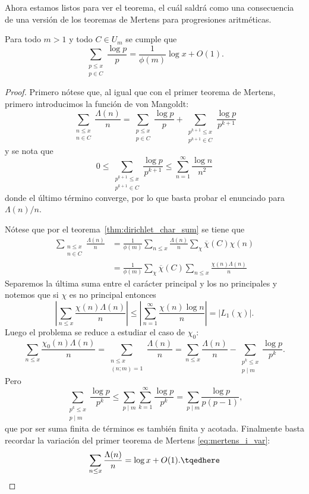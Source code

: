 \documentclass[teoria-numeros.tex]{subfiles}
\begin{document}
Ahora estamos listos para ver el teorema, el cuál saldrá como una consecuencia de una versión de los teoremas de Mertens para progresiones aritméticas.
\begin{thm}
	Para todo $m > 1$ y todo $C \in U_m$ se cumple que
	$$ \sum_{\substack{ p\le x \\ p\in C }} \frac{\log p}{p} = \frac{1}{\phi(m)}\log x + O(1). $$
\end{thm}
\begin{proof}
	Primero nótese que, al igual que con el primer teorema de Mertens, primero introducimos la función de von Mangoldt:
	$$ \sum_{\substack{n\le x \\ n\in C}} \frac{\Lambda(n)}{n} = \sum_{\substack{p\le x \\ p\in C}} \frac{\log p}{p}
	+ \sum_{\substack{p^{k+1}\le x \\ p^{k+1}\in C}} \frac{\log p}{p^{k+1}} $$
	y se nota que
	$$ 0 \le \sum_{\substack{p^{k+1}\le x \\ p^{k+1}\in C}} \frac{\log p}{p^{k+1}} \le \sum_{n=1}^\infty \frac{\log n}{n^2} $$
	donde el último término converge, por lo que basta probar el enunciado para $\Lambda(n)/n$.

	Nótese que por el teorema~\ref{thm:dirichlet_char_sum} se tiene que
	\begin{align*}
		\sum_{\substack{n\le x \\ n\in C}}\frac{\Lambda(n)}{n} &= \frac{1}{\phi(m)}\sum_{n\le x} \frac{\Lambda(n)}{n}\sum_\chi \overline{\chi}(C)\chi(n) \\
		&= \frac{1}{\phi(m)}\sum_\chi \overline{\chi}(C) \sum_{n\le x} \frac{\chi(n)\Lambda(n)}{n}
	\end{align*}
	Separemos la última suma entre el carácter principal y los no principales y notemos que si $\chi$ es no principal entonces
	$$ \left| \sum_{n\le x} \frac{\chi(n)\Lambda(n)}{n} \right| \le \left| \sum_{n=1}^\infty \frac{\chi(n)\log n}{n} \right| = |L_1(\chi)|. $$
	Luego el problema se reduce a estudiar el caso de $\chi_0$:
	$$ \sum_{n\le x} \frac{\chi_0(n)\Lambda(n)}{n} = \sum_{\substack{n\le x \\ (n; m)=1}} \frac{\Lambda(n)}{n}
	= \sum_{n\le x} \frac{\Lambda(n)}{n} - \sum_{\substack{p^k\le x \\ p\mid m}} \frac{\log p}{p^k}. $$
	Pero
	$$ \sum_{\substack{p^k\le x \\ p\mid m}} \frac{\log p}{p^k} \le \sum_{p \mid m}\sum_{k=1}^\infty \frac{\log p}{p^k}
	= \sum_{p\mid m} \frac{\log p}{p(p - 1)}, $$
	que por ser suma finita de términos es también finita y acotada.
	Finalmente basta recordar la variación del primer teorema de Mertens \eqref{eq:mertens_i_var}:
	\begin{equation}
		\sum_{n\le x} \frac{\Lambda(n)}{n} = \log x + O(1). \tqedhere
	\end{equation}
\end{proof}
\end{document}
